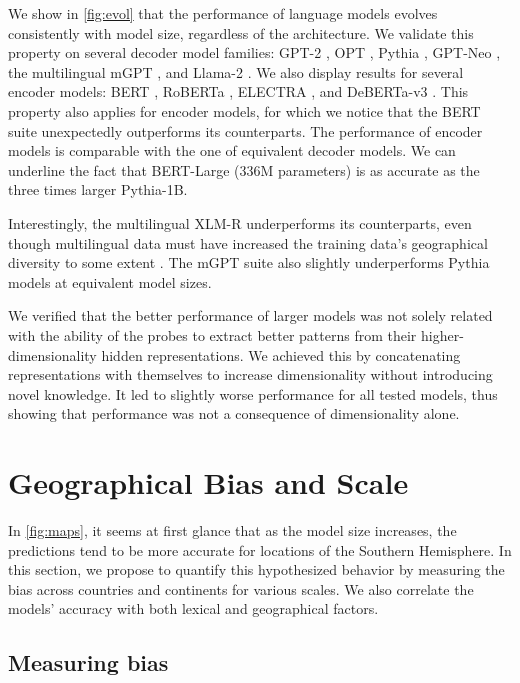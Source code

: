 We show in \autoref{fig:evol} that the performance of language models evolves consistently with model size, regardless of the architecture. We validate this property on several decoder model families: GPT-2 \citep{gpt2}, OPT \citep{zhang2022opt}, Pythia \citep{pythia}, GPT-Neo \citep{gpt-neo}, the multilingual mGPT \citep{shliazhko2023mgpt}, and Llama-2 \citep{touvron2023llama}. We also display results for several encoder models: BERT \citep{devlin-etal-2019-bert,turc2019}, RoBERTa \citep{roberta}, ELECTRA \citep{electra}, and DeBERTa-v3 \citep{deberta}. This property also applies for encoder models, for which we notice that the BERT suite unexpectedly outperforms its counterparts. The performance of encoder models is comparable with the one of equivalent decoder models. We can underline the fact that BERT-Large (336M parameters) is as accurate as the three times larger Pythia-1B.

Interestingly, the multilingual XLM-R \citep{conneau2019unsupervised} underperforms its counterparts, even though multilingual data must have increased the training data's geographical diversity to some extent \citep{faisal-anastasopoulos-2021-investigating}. The mGPT suite also slightly underperforms Pythia models at equivalent model sizes.

We verified that the better performance of larger models was not solely related with the ability of the probes to extract better patterns from their higher-dimensionality hidden representations. We achieved this by concatenating representations with themselves to increase dimensionality without introducing novel knowledge. It led to slightly worse performance for all tested models, thus showing that performance was not a consequence of dimensionality alone.

\section{Geographical Bias and Scale}

In \autoref{fig:maps}, it seems at first glance that as the model size increases, the predictions tend to be more accurate for locations of the Southern Hemisphere. In this section, we propose to quantify this hypothesized behavior by measuring the bias across countries and continents for various scales. We also correlate the models' accuracy with both lexical and geographical factors.

\subsection{Measuring bias}

